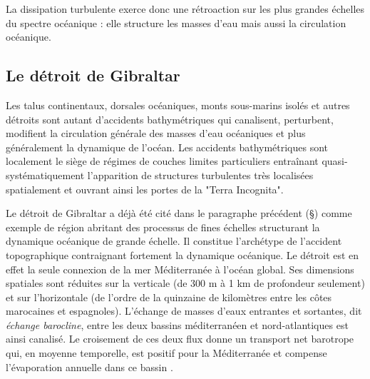 La dissipation turbulente exerce donc une rétroaction sur les plus grandes échelles du spectre océanique : elle  structure les masses d'eau mais aussi la circulation océanique.
\color{black}


\subsection{Le détroit de Gibraltar}

Les talus continentaux, dorsales océaniques, monts sous-marins isolés et autres détroits sont autant d'accidents bathymétriques qui canalisent, perturbent, modifient la circulation générale des masses d'eau océaniques et plus généralement la dynamique de l'océan. Les accidents bathymétriques sont localement le siège de régimes de couches limites particuliers entraînant quasi-systématiquement l'apparition de structures turbulentes très localisées spatialement et ouvrant ainsi les portes de la "Terra Incognita".

Le détroit de Gibraltar a déjà été cité dans le paragraphe précédent (\S {}) comme exemple de région abritant des processus de fines échelles structurant la dynamique océanique de grande échelle. Il constitue l'archétype de l'accident topographique contraignant fortement la dynamique océanique. Le détroit est en effet la seule connexion de la mer Méditerranée à l'océan global. Ses dimensions spatiales sont réduites sur la verticale (de 300 m à 1 km de profondeur seulement) et sur l'horizontale (de l'ordre de la quinzaine de kilomètres entre les côtes marocaines et espagnoles). L'échange de masses d'eaux entrantes et sortantes, dit \textit{échange barocline}, entre les deux bassins méditerranéen et nord-atlantiques est ainsi canalisé. Le croisement de ces deux flux donne un transport net barotrope qui, en moyenne temporelle, est positif pour la Méditerranée et compense l'évaporation annuelle dans ce bassin \citep{Bryden94}.

